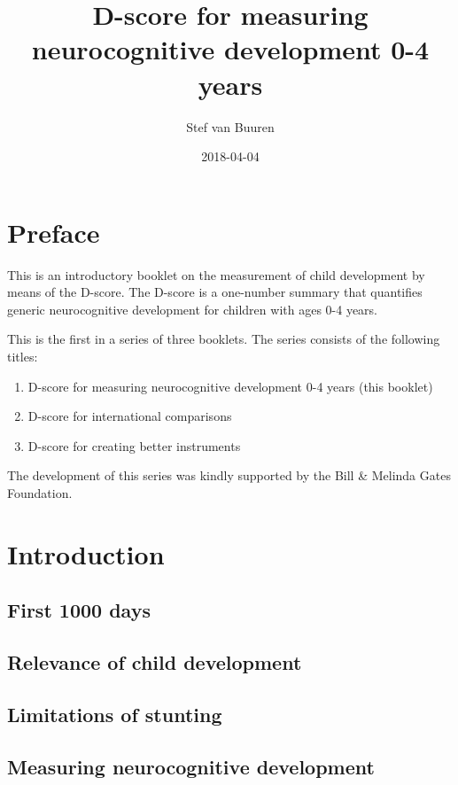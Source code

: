 \documentclass[]{book}
\title{D-score for measuring neurocognitive development 0-4 years}
\author{Stef van Buuren}
\date{2018-04-04}
\providecommand{\tightlist}{%
  \setlength{\itemsep}{0pt}\setlength{\parskip}{0pt}}
\begin{document}
\maketitle

{
\setcounter{tocdepth}{1}
\tableofcontents
}
\chapter*{Preface}\label{preface}

This is an introductory booklet on the measurement of child development
by means of the D-score. The D-score is a one-number summary that
quantifies generic neurocognitive development for children with ages 0-4
years.

This is the first in a series of three booklets. The series consists of
the following titles:

\begin{enumerate}
\def\labelenumi{\arabic{enumi}.}
\tightlist
\item
  D-score for measuring neurocognitive development 0-4 years (this
  booklet)
\item
  D-score for international comparisons
\item
  D-score for creating better instruments
\end{enumerate}

The development of this series was kindly supported by the Bill \&
Melinda Gates Foundation.

\chapter{Introduction}\label{intro}

\section{First 1000 days}\label{first-1000-days}

\section{Relevance of child
development}\label{relevance-of-child-development}

\section{Limitations of stunting}\label{limitations-of-stunting}

\section{Measuring neurocognitive
development}\label{measuring-neurocognitive-development}
\end{document}

